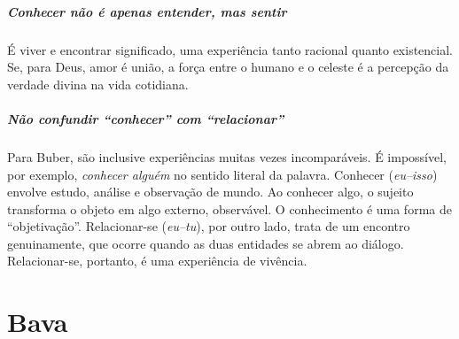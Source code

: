 \paragraph{Conhecer não é apenas entender, mas sentir} É viver e encontrar significado, uma experiência tanto racional quanto existencial. Se, para Deus, amor é união, a força entre o humano e o celeste é a percepção da verdade divina na vida cotidiana.

\paragraph{Não confundir ``conhecer'' com ``relacionar''} Para Buber, são inclusive experiências muitas vezes incomparáveis. É impossível, por exemplo, \textit{conhecer alguém} no sentido literal da palavra. Conhecer (\textit{eu--isso}) envolve estudo, análise e observação de mundo. Ao conhecer algo, o sujeito transforma o objeto em algo externo, observável. O conhecimento é uma forma de ``objetivação''. Relacionar-se (\textit{eu--tu}), por outro lado, trata de um encontro genuinamente, que ocorre quando as duas entidades se abrem ao diálogo. Relacionar-se, portanto, é uma experiência de vivência.

\chapter*{Bava \smallskip{}}

